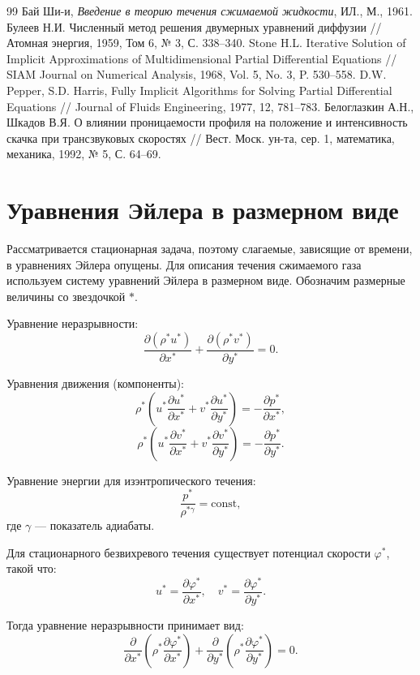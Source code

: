 \documentclass[a4paper,12pt]{article}
\begin{document}
	\begin{thebibliography}{99}
		 Бай Ши-и, \textit{Введение в теорию течения сжимаемой жидкости}, ИЛ., М., 1961.
		 Булеев Н.И. Численный метод решения двумерных уравнений диффузии // Атомная энергия, 1959, Том 6, № 3, С. 338–340.
		 Stone H.L. Iterative Solution of Implicit Approximations of Multidimensional Partial Differential Equations // SIAM Journal on Numerical Analysis, 1968, Vol. 5, No. 3, P. 530–558.
		 D.W. Pepper, S.D. Harris, Fully Implicit Algorithms for Solving Partial Differential Equations // Journal of Fluids Engineering, 1977, 12, 781–783.
		 Белоглазкин А.Н., Шкадов В.Я. О влиянии проницаемости профиля на положение и интенсивность скачка при трансзвуковых скоростях // Вест. Моск. ун-та, сер. 1, математика, механика, 1992, № 5, С. 64–69.
	\end{thebibliography}
	\newpage
	
	\section{Уравнения Эйлера в размерном виде}
	
	Рассматривается стационарная задача, поэтому слагаемые, зависящие от времени, в уравнениях Эйлера опущены. Для описания течения сжимаемого газа используем систему уравнений Эйлера в размерном виде. Обозначим размерные величины со звездочкой $*$. 
	
	Уравнение неразрывности:
	\[
	\frac{\partial (\rho^* u^*)}{\partial x^*} + \frac{\partial (\rho^* v^*)}{\partial y^*} = 0.
	\]
	
	Уравнения движения (компоненты):
	\[
	\rho^* \left( u^* \frac{\partial u^*}{\partial x^*} + v^* \frac{\partial u^*}{\partial y^*} \right) = -\frac{\partial p^*}{\partial x^*},
	\]
	\[
	\rho^* \left( u^* \frac{\partial v^*}{\partial x^*} + v^* \frac{\partial v^*}{\partial y^*} \right) = -\frac{\partial p^*}{\partial y^*}.
	\]
	
	Уравнение энергии для изэнтропического течения:
	\[
	\frac{p^*}{\rho^{*\gamma}} = \text{const},
	\]
	где $\gamma$ — показатель адиабаты.
	
	Для стационарного безвихревого течения существует потенциал скорости $\varphi^*$, такой что:
	\[
	u^* = \frac{\partial \varphi^*}{\partial x^*}, \quad v^* = \frac{\partial \varphi^*}{\partial y^*}.
	\]
	
	Тогда уравнение неразрывности принимает вид:
	\[
	\frac{\partial}{\partial x^*} \left( \rho^* \frac{\partial \varphi^*}{\partial x^*} \right) + \frac{\partial}{\partial y^*} \left( \rho^* \frac{\partial \varphi^*}{\partial y^*} \right) = 0.
	\]
	
\end{document}
